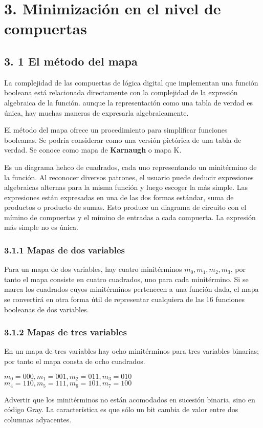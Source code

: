 \newpage \section*{3. Minimizaci\'{o}n en el nivel de compuertas} \subsection*{3.
1 El m\'{e}todo del mapa}

La complejidad de las compuertas de l\'{o}gica digital que implementan una
funci\'{o}n booleana est\'{a} relacionada directamente con la complejidad de la
expresi\'{o}n algebraica de la funci\'{o}n. aunque la representaci\'{o}n como
una tabla de verdad es \'{u}nica, hay muchas maneras de expresarla
algebraicamente.

El m\'{e}todo del mapa ofrece un procedimiento para simplificar funciones
booleanas. Se podr\'{i}a considerar como una versi\'{o}n pict\'{o}rica de una
tabla de verdad. Se conoce como mapa de \textbf{Karnaugh} o mapa K.

Es un diagrama hehco de cuadrados, cada uno representando un minit\'{e}rmino de
la funci\'{o}n. Al reconocer diversos patrones, el usuario puede deducir
expresiones algebraicas alternas para la misma funci\'{o}n y luego escoger la
m\'{a}s simple. Las expresiones est\'{a}n expresadas en una de las dos formas
est\'{a}ndar, suma de productos o producto de sumas. Esto produce un diagrama de
circuito con el m\'{i}mino de compuertas y el m\'{i}mino de entradas a cada
compuerta. La expresi\'{o}n m\'{a}s simple no es \'{u}nica.

\subsubsection*{3.1.1 Mapas de dos variables} Para un mapa de dos variables,
hay cuatro minit\'{e}rminos $m_0, m_1, m_2, m_3$, por tanto el mapa consiste en
cuatro cuadrados, uno para cada minit\'{e}rmino. Si se marca los cuadrados cuyos
minit\'{e}rminos pertenecen a una funci\'{o}n dada, el mapa se convertir\'{a} en
otra forma \'{u}til de representar cualquiera de las 16 funciones booleanas de
dos variables.

\subsubsection*{3.1.2 Mapas de tres variables} En un mapa de tres variables hay
ocho minit\'{e}rminos para tres variables binarias; por tanto el mapa consta de
ocho cuadrados. \begin{center} $m_0 = 000, m_1 = 001, m_2 = 011, m_3 = 010$ \\
    $m_4 = 110, m_5 = 111, m_6 = 101, m_7 = 100$ \end{center} Advertir que los
minit\'{e}rminos no est\'{a}n acomodados en sucesi\'{o}n binaria, sino en
c\'{o}digo Gray. La caracter\'{i}stica es que s\'{o}lo un bit cambia de valor
entre dos columnas adyacentes.

